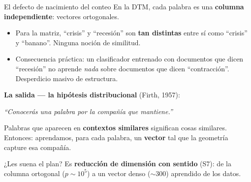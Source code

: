 \documentclass{beamer}
\newcommand{\1}{\mathbb{I}}
\begin{document}
\begin{frame}{El defecto de nacimiento del conteo}
\small
En la DTM, cada palabra es una \textbf{columna independiente}: vectores ortogonales.
\pause
\begin{itemize}\itemsep5pt
  \item Para la matriz, ``crisis'' y ``recesión'' son \textbf{tan distintas} entre sí como ``crisis'' y ``banano''. Ninguna noción de similitud. \pause
  \item Consecuencia práctica: un clasificador entrenado con documentos que dicen ``recesión'' no aprende \emph{nada} sobre documentos que dicen ``contracción''. Desperdicio masivo de estructura. \pause
\end{itemize}

\vspace{0.2cm}
\textbf{La salida --- la hipótesis distribucional} (Firth, 1957):
\begin{center}
\emph{``Conocerás una palabra por la compañía que mantiene.''}
\end{center}
Palabras que aparecen en \textbf{contextos similares} significan cosas similares. Entonces: aprendamos, para cada palabra, un \textbf{vector} tal que la geometría capture esa compañía.
\pause

\vspace{0.15cm}
\begin{block}{¿Les suena el plan?}
Es \textbf{reducción de dimensión con sentido} (S7): de la columna ortogonal ($p \sim 10^5$) a un vector denso ($\sim 300$) aprendido de los datos.
\end{block}
\end{frame}
\end{document}

